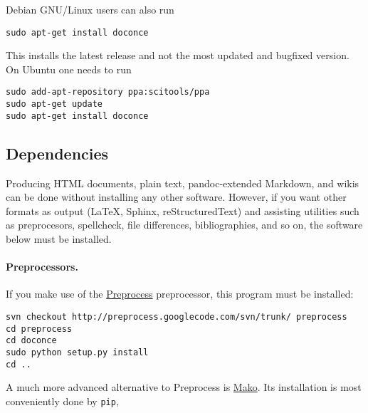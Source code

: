 \documentclass[%
oneside,                 %
final,                   %
10pt]{article}
\begin{document}
Debian GNU/Linux users can also run
\vspace{4pt}
\begin{Verbatim}[numbers=none,frame=lines,label=\fbox{{\tiny Terminal}},fontsize=\fontsize{9pt}{9pt},
labelposition=topline,framesep=2.5mm,framerule=0.7pt]
sudo apt-get install doconce
\end{Verbatim}
This installs the latest release and not the most updated and bugfixed
version.
On Ubuntu one needs to run
\vspace{4pt}
\begin{Verbatim}[numbers=none,frame=lines,label=\fbox{{\tiny Terminal}},fontsize=\fontsize{9pt}{9pt},
labelposition=topline,framesep=2.5mm,framerule=0.7pt]
sudo add-apt-repository ppa:scitools/ppa
sudo apt-get update
sudo apt-get install doconce
\end{Verbatim}

\subsection{Dependencies}

Producing HTML documents, plain text, pandoc-extended Markdown,
and wikis can be done without installing any other
software. However, if you want other formats as output
({\LaTeX}, Sphinx, reStructuredText) and assisting utilities such
as preprocesors, spellcheck, file differences, bibliographies,
and so on, the software below must be installed.


\paragraph{Preprocessors.}
If you make use of the \href{{http://code.google.com/p/preprocess}}{Preprocess}
preprocessor, this program must be installed:

\vspace{4pt}
\begin{Verbatim}[numbers=none,frame=lines,label=\fbox{{\tiny Terminal}},fontsize=\fontsize{9pt}{9pt},
labelposition=topline,framesep=2.5mm,framerule=0.7pt]
svn checkout http://preprocess.googlecode.com/svn/trunk/ preprocess
cd preprocess
cd doconce
sudo python setup.py install
cd ..
\end{Verbatim}

A much more advanced alternative to Preprocess is
\href{{http://www.makotemplates.org}}{Mako}. Its installation is most
conveniently done by {\fontsize{10pt}{10pt}\Verb!pip!},
\end{document}
